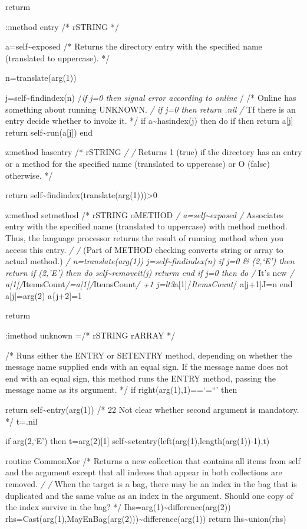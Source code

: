 returm

::method entry /* rSTRING */

a=self\textasciitilde exposed /* Returns the directory entry with the
specified name (translated to uppercase). */

n=translate(arg(1))

j=self\textasciitilde findindex(n) /\emph{if j=0 then signal error
according to online }/ /* Online has something about running UNKNOWN.
\emph{/ if j=0 then return .nil /} Tf there is an entry decide whether
to invoke it. */ if a\textasciitilde hasindex(j) then do if \a[j+2] then
return a{[}j{]} return self\textasciitilde run(a{[}j{]}) end

z:method hasentry /* rSTRING \emph{/ /} Returns 1\textbar{} (true) if
the directory has an entry or a method for the specified name
(translated to uppercase) or O (false) otherwise. */

return self\textasciitilde findindex(translate(arg(1)))\textgreater0

z:method setmethod /* rSTRING oMETHOD \emph{/
a=self\textasciitilde exposed /} Associates entry with the specified
name (translated to uppercase) with method method. Thus, the language
processor returns the result of running method when you access this
entry. \emph{/ /} (Part of METHOD checking converts string or array to
actual method.) \emph{/ n=translate(arg(1))
j=self\textasciitilde findindex(n) if j=0 \& \arg(2,`E') then return if
\arg(2,'E') then do self\textasciitilde removeit(j) returm end if j=0
then do /} It's new \emph{/
a{[}1{]}/}ItemsCount\emph{/=a{[}1{]}/}ItemsCount\emph{/ +1
j=lt3}a{[}1{]}/\emph{ItemsCount}/ a{[}j+1{]}J=n end a{[}j{]}=arg(2)
a\{j+2{]}=1

returm

:imethod unknown =/* rSTRING rARRAY */

/* Runs either the ENTRY or SETENTRY method, depending on whether the
message name supplied ends with an equal sign. If the message name does
not end with an equal sign, this method runs the ENTRY method, passing
the message name as its argument. */ if right(arg(1),1)==`=``' then

return self\textasciitilde entry(arg(1)) /* 22 Not clear whether second
argument is mandatory. */ t=.nil

if arg(2,`E') then t=arg(2){[}1{]}
self\textasciitilde setentry(left(arg(1),length(arg(1))-1),t)

routine CommonXor /* Returns a new collection that contains all items
from self and the argument except that all indexes that appear in both
collections are removed. \emph{/ /} When the target is a bag, there may
be an index in the bag that is duplicated and the same value as an index
in the argument. Should one copy of the index survive in the bag? */
Ihs=arg(1)\textasciitilde difference(arg(2))
rhs=Cast(arg(1),MayEnBag(arg(2)))\textasciitilde difference(arg(1))
return lhs\textasciitilde union(rhs)

